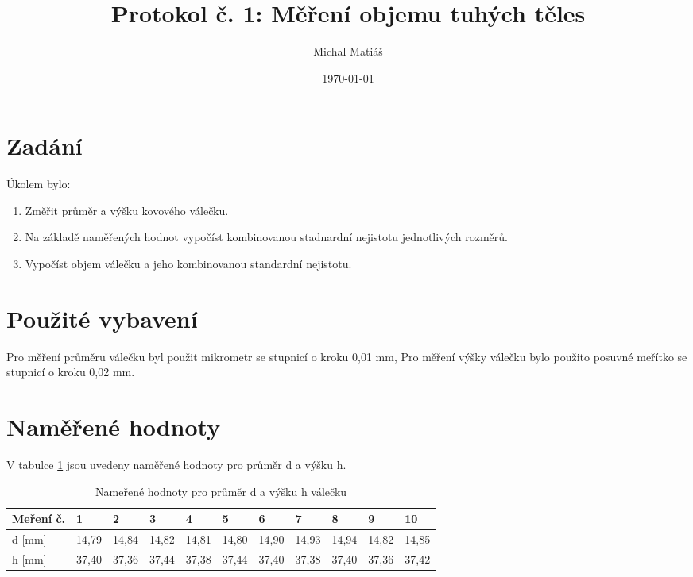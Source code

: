 \documentclass[a4paper]{article}
\title{\vspace{-1cm}Protokol č. 1: Měření objemu tuhých těles}
\author{Michal Matiáš}
\date{\today}
\begin{document}
\maketitle

\section{Zadání}
Úkolem bylo:\\
\begin{enumerate}
\item Změřit průměr a výšku kovového válečku.
\item Na základě naměřených hodnot vypočíst kombinovanou stadnardní nejistotu jednotlivých rozměrů.
\item Vypočíst objem válečku a jeho kombinovanou standardní nejistotu.
\end{enumerate}
\section{Použité vybavení}
Pro měření průměru válečku byl použit mikrometr se stupnicí o kroku 0,01 mm, Pro měření výšky válečku bylo použito posuvné meřítko se stupnicí o kroku 0,02 mm.

\section{Naměřené hodnoty}
V tabulce \ref{table:1} jsou uvedeny naměřené hodnoty pro průměr d a výšku h.
\begin{center}
\begin{table}[h!]
\begin{tabular}{|| l | l | l | l | l | l | l | l | l | l | l ||}
\hline
Meření č. & 1 & 2 & 3 & 4 & 5 & 6 & 7 & 8 & 9 & 10\\
\hline\hline
d [mm] & 14,79 & 14,84 & 14,82 & 14,81 & 14,80 & 14,90 & 14,93 & 14,94 & 14,82 & 14,85\\
\hline
h [mm] & 37,40 & 37,36 & 37,44 & 37,38 & 37,44 & 37,40 & 37,38 & 37,40 & 37,36 & 37,42\\
\hline
\end{tabular}
\caption{Nameřené hodnoty pro průměr d a výšku h válečku}
\label{table:1}
\end{table}
\end{center}
\end{document}
